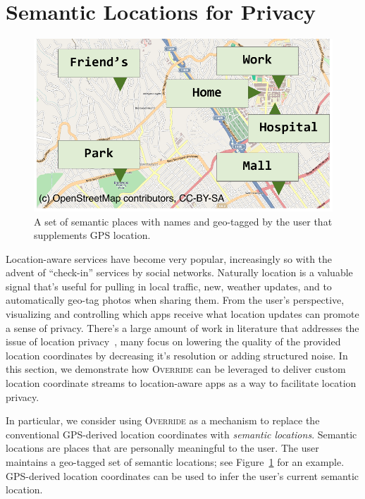 \documentclass[10pt]{sensys-proc}
\begin{document}
\section{Semantic Locations for Privacy}
\label{Sec:example}

\begin{figure}[h]
\label{fig:semantic_places}
\includegraphics[width=\columnwidth]{../figures/semantic_location_3.pdf}
\caption{A set of semantic places with names and geo-tagged by the user that supplements GPS location.}
\end{figure}

Location-aware services have become very popular, increasingly so with the advent of ``check-in'' services by social networks. Naturally location is a valuable signal that's useful for pulling in local traffic, new, weather updates, and to automatically geo-tag photos when sharing them. From the user's perspective, visualizing and controlling which apps receive what location updates can promote a sense of privacy. There's a large amount of work in literature that addresses the issue of location privacy~\cite{krumm:survey}, many focus on lowering the quality of the provided location coordinates by decreasing it's resolution or adding structured noise. In this section, we demonstrate how \textsc{Override} can be leveraged to deliver custom location coordinate streams to location-aware apps as a way to facilitate location privacy.

In particular, we consider using \textsc{Override} as a mechanism to replace the conventional GPS-derived location coordinates with \emph{semantic locations}. Semantic locations are places that are personally meaningful to the user. The user maintains a geo-tagged set of semantic locations; see Figure~\ref{fig:semantic_places} for an example. GPS-derived location coordinates can be used to infer the user's current semantic location.
\end{document}
